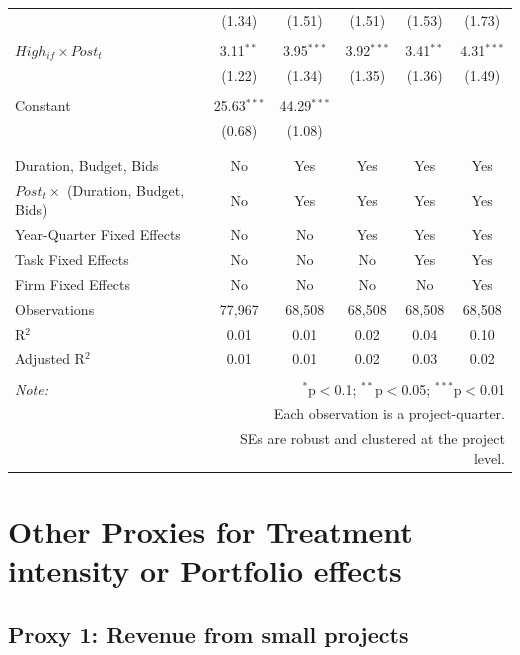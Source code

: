 \documentclass[
]{article}
\begin{document}
\begin{table}[H]
\begin{tabular}{@{\extracolsep{-2pt}}lccccc}
  & (1.34) & (1.51) & (1.51) & (1.53) & (1.73) \\ 
  & & & & & \\ 
 $High_{if} \times Post_t$ & 3.11$^{**}$ & 3.95$^{***}$ & 3.92$^{***}$ & 3.41$^{**}$ & 4.31$^{***}$ \\ 
  & (1.22) & (1.34) & (1.35) & (1.36) & (1.49) \\ 
  & & & & & \\ 
 Constant & 25.63$^{***}$ & 44.29$^{***}$ &  &  &  \\ 
  & (0.68) & (1.08) &  &  &  \\ 
  & & & & & \\ 
\hline \\[-1.8ex] 
Duration, Budget, Bids & No & Yes & Yes & Yes & Yes \\ 
$Post_t \times$  (Duration, Budget, Bids) & No & Yes & Yes & Yes & Yes \\ 
Year-Quarter Fixed Effects & No & No & Yes & Yes & Yes \\ 
Task Fixed Effects & No & No & No & Yes & Yes \\ 
Firm Fixed Effects & No & No & No & No & Yes \\ 
Observations & 77,967 & 68,508 & 68,508 & 68,508 & 68,508 \\ 
R$^{2}$ & 0.01 & 0.01 & 0.02 & 0.04 & 0.10 \\ 
Adjusted R$^{2}$ & 0.01 & 0.01 & 0.02 & 0.03 & 0.02 \\ 
\hline 
\hline \\[-1.8ex] 
\textit{Note:}  & \multicolumn{5}{r}{$^{*}$p$<$0.1; $^{**}$p$<$0.05; $^{***}$p$<$0.01} \\ 
 & \multicolumn{5}{r}{Each observation is a project-quarter.} \\ 
 & \multicolumn{5}{r}{SEs are robust and clustered at the project level.} \\ 
\end{tabular} 
\end{table}

\hypertarget{other-proxies-for-treatment-intensity-or-portfolio-effects}{%
\section{Other Proxies for Treatment intensity or Portfolio
effects}\label{other-proxies-for-treatment-intensity-or-portfolio-effects}}

\hypertarget{proxy-1-revenue-from-small-projects}{%
\subsection{Proxy 1: Revenue from small
projects}\label{proxy-1-revenue-from-small-projects}}
\end{document}
